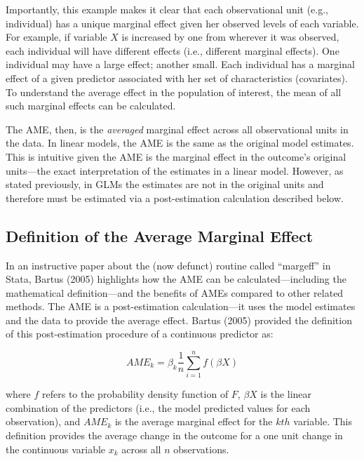 \documentclass[]{DissertateUSU}
\begin{document}
Importantly, this example makes it clear that each observational unit
(e.g., individual) has a unique marginal effect given her observed
levels of each variable. For example, if variable \(X\) is increased by
one from wherever it was observed, each individual will have different
effects (i.e., different marginal effects). One individual may have a
large effect; another small. Each individual has a marginal effect of a
given predictor associated with her set of characteristics (covariates).
To understand the average effect in the population of interest, the mean
of all such marginal effects can be calculated.

The AME, then, is the \emph{averaged} marginal effect across all
observational units in the data. In linear models, the AME is the same
as the original model estimates. This is intuitive given the AME is the
marginal effect in the outcome's original units---the exact
interpretation of the estimates in a linear model. However, as stated
previously, in GLMs the estimates are not in the original units and
therefore must be estimated via a post-estimation calculation described
below.

\subsection{Definition of the Average Marginal
Effect}\label{definition-of-the-average-marginal-effect}

In an instructive paper about the (now defunct) routine called
``margeff'' in Stata, Bartus (2005) highlights how the AME can be
calculated---including the mathematical definition---and the benefits of
AMEs compared to other related methods. The AME is a post-estimation
calculation---it uses the model estimates and the data to provide the
average effect. Bartus (2005) provided the definition of this
post-estimation procedure of a continuous predictor as:

\begin{equation}
AME_{k} = \beta_k \frac{1}{n} \sum_{i=1}^n f(\beta X)
\end{equation}

\noindent where \(f\) refers to the probability density function of
\(F\), \(\beta X\) is the linear combination of the predictors (i.e.,
the model predicted values for each observation), and \(AME_k\) is the
average marginal effect for the \(kth\) variable. This definition
provides the average change in the outcome for a one unit change in the
continuous variable \(x_k\) across all \(n\) observations.
\end{document}
